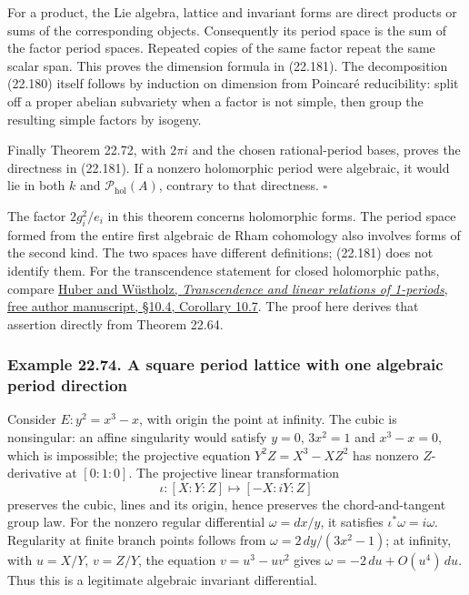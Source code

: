 \documentclass[
  11pt,
  a4paper,
]{article}
\begin{document}
For a product, the Lie algebra, lattice and invariant forms are direct
products or sums of the corresponding objects. Consequently its period
space is the sum of the factor period spaces. Repeated copies of the
same factor repeat the same scalar span. This proves the dimension
formula in (22.181). The decomposition (22.180) itself follows by
induction on dimension from Poincaré reducibility: split off a proper
abelian subvariety when a factor is not simple, then group the resulting
simple factors by isogeny.

Finally Theorem 22.72, with \(2\pi i\) and the chosen rational-period
bases, proves the directness in (22.181). If a nonzero holomorphic
period were algebraic, it would lie in both \(k\) and
\(\mathcal P_{\mathrm{hol}}(A)\), contrary to that directness.
\(\square\)

The factor \(2g_i^2/e_i\) in this theorem concerns holomorphic forms.
The period space formed from the entire first algebraic de Rham
cohomology also involves forms of the second kind. The two spaces have
different definitions; (22.181) does not identify them. For the
transcendence statement for closed holomorphic paths, compare
\href{https://home.mathematik.uni-freiburg.de/arithgeom/preprints/huber-einsmotive.pdf}{Huber
and Wüstholz, \emph{Transcendence and linear relations of 1-periods},
free author manuscript, §10.4, Corollary 10.7}. The proof here derives
that assertion directly from Theorem 22.64.

\subsubsection{Example 22.74. A square period lattice with one algebraic
period
direction}\label{example-22.74.-a-square-period-lattice-with-one-algebraic-period-direction}

Consider \(E:y^2=x^3-x\), with origin the point at infinity. The cubic
is nonsingular: an affine singularity would satisfy \(y=0\), \(3x^2=1\)
and \(x^3-x=0\), which is impossible; the projective equation
\(Y^2Z=X^3-XZ^2\) has nonzero \(Z\)-derivative at \([0:1:0]\). The
projective linear transformation \[
 \iota:[X:Y:Z]\longmapsto[-X:iY:Z]
 \tag{22.183}
\] preserves the cubic, lines and its origin, hence preserves the
chord-and-tangent group law. For the nonzero regular differential
\(\omega=dx/y\), it satisfies \(\iota^*\omega=i\omega\). Regularity at
finite branch points follows from \(\omega=2\,dy/(3x^2-1)\); at
infinity, with \(u=X/Y\), \(v=Z/Y\), the equation \(v=u^3-uv^2\) gives
\(\omega=-2\,du+O(u^4)\,du\). Thus this is a legitimate algebraic
invariant differential.
\end{document}
